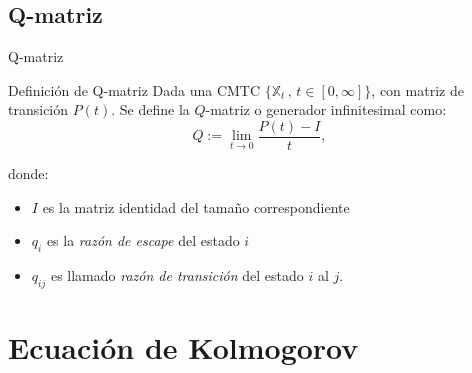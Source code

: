 \documentclass{beamer}
\begin{document}
\subsection{Q-matriz}
\begin{frame}{Q-matriz}
\begin{block}{Definición de Q-matriz}
Dada una CMTC $\{\mathbb{X}_t \, , \, t\in [0,\infty]\}$, con matriz de transición $P(t)$. Se define la $Q$-matriz o generador infinitesimal como:
$$Q:=\lim_{t \to 0}\dfrac{P(t)-I}{t},$$
\end{block}
donde:
\begin{itemize}
\item $I$ es la matriz identidad del tamaño correspondiente
\item  $q_i$ es la \textit{razón de escape} del estado $i$
\item $q_{ij}$ es llamado \textit{razón de transición} del estado $i$ al $j$.
\end{itemize}
\end{frame}
\section{Ecuación de Kolmogorov}
\end{document}

